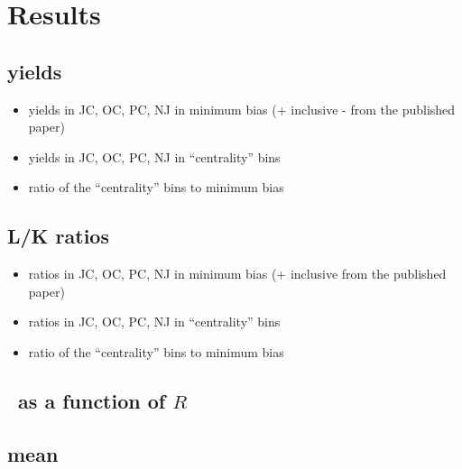 
\section{Results}
\label{sec:Results}

\subsection{\pt yields}

\begin{itemize}
	\item yields in JC, OC, PC, NJ in minimum bias (+ inclusive - from the published paper)
	\item yields in JC, OC, PC, NJ in ``centrality'' bins
	\item ratio of the ``centrality'' bins to minimum bias 
\end{itemize}


\subsection{L/K ratios}

\begin{itemize}
	\item ratios in JC, OC, PC, NJ in minimum bias (+ inclusive from the published paper)
	\item ratios in JC, OC, PC, NJ in ``centrality'' bins
	\item ratio of the ``centrality'' bins to minimum bias 
\end{itemize}


\subsection{\Vzero\ as a function of $R$}

\subsection{mean \pt}


